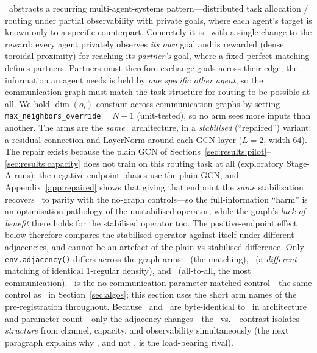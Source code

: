 \pairrouting\ abstracts a recurring multi-agent-systems pattern---distributed
task allocation / routing under partial observability with private goals, where
each agent's target is known only to a specific counterpart. Concretely it is
\coordgrid\ with a single change to the reward: every agent
privately observes \emph{its own} goal and is rewarded (dense toroidal
proximity) for reaching its \emph{partner's} goal, where a fixed perfect
matching defines partners. Partners must therefore exchange goals across
their edge; the information an agent needs is held by \emph{one specific
other agent}, so the communication graph must match the task structure for
routing to be possible at all. We hold $\dim(o_i)$ constant across
communication graphs by setting \texttt{max\_neighbors\_override}$=N{-}1$
(unit-tested), so no arm sees more inputs than another. The arms are the
\emph{same} \gnnqmix\ architecture, in a \emph{stabilised} (``repaired'')
variant: a residual connection and LayerNorm around each GCN layer
($L{=}2$, width 64). The repair exists because the plain GCN of
Sections~\ref{sec:results:pilot}--\ref{sec:results:capacity} does not train
on this routing task at all (exploratory Stage-A runs); the negative-endpoint
phases use the plain GCN, and Appendix~\ref{app:repaired} shows that giving
that endpoint the \emph{same} stabilisation recovers \gnnqmix\ to parity
with the no-graph controls---so the full-information ``harm'' is an
optimisation pathology of the unstabilised operator, while the graph's
\emph{lack of benefit} there holds for the stabilised operator too. The
positive-endpoint effect below therefore compares the stabilised operator
against itself under different adjacencies, and cannot be an artefact of the
plain-vs-stabilised difference.
Only \texttt{env.adjacency()} differs across the graph arms:
\gtrue\ (the matching), \gwrong\ (a \emph{different} matching of identical
$1$-regular density), and \gcomplete\ (all-to-all, the most communication).
\mlpc\ is the no-communication parameter-matched control---the same
control as \mlpqmix\ in Section~\ref{sec:algos}; this section uses the
short arm names of the pre-registration throughout. Because \gwrong\
and \gcomplete\ are byte-identical to \gtrue\ in architecture and parameter
count---only the adjacency changes---the \gtrue\ vs.\ \gcomplete\ contrast
isolates \emph{structure} from channel, capacity, and observability
simultaneously (the next paragraph explains why \gcomplete, and not \gwrong,
is the load-bearing rival).

